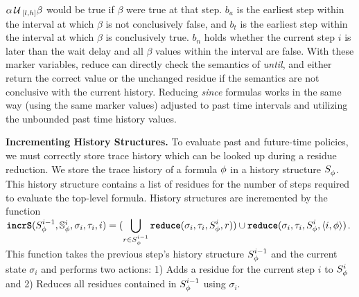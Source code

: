 $\alpha \until_{[l,h]} \beta$ would be true if $\beta$ were true at that step.
$b_a$ is the earliest step within the interval at which $\beta$ is not conclusively false,
and $b_t$ is the earliest step within the interval at which $\beta$ is conclusively true.
$b_n$ holds whether the current step $i$ is later than the wait delay and all $\beta$
values within the interval are false. With these marker variables, reduce can directly
check the semantics of \emph{until}, and either return the correct value or the unchanged
residue if the semantics are not conclusive with the current history. Reducing \emph{since}
formulas works in the same way (using the same marker values) adjusted to past time intervals
and utilizing the unbounded past time history values.


\textbf{Incrementing History Structures.}
To evaluate past and future-time policies, we must correctly store trace history which can be looked up during a residue reduction.
We store the trace history of a formula $\policyv$ in a history structure $\histst[\policyv]{}$.
This history structure contains a list of residues for the number of steps required to evaluate the top-level formula. History structures are incremented by the function
$\incrS(\histst[\policyv]{i-1}, \histSt[\policyv]{i}, \sigma_i, \tau_i, i) =
(\displaystyle\bigcup_{r \in \histst[\policyv]{i-1}} \reduce(\sigma_i, \tau_i, \histst[\policyv]{i}, r)) \cup
\reduce(\sigma_i, \tau_i, \histst[\policyv]{i}, \rp{i}{\policyv})$.
%
This function takes the previous step's history structure $\histst[\policyv]{i-1}$ and the current state $\sigma_i$
and performs two actions:
	1) Adds a residue for the current step $i$ to $\histst[\policyv]{i}$ and
	2) Reduces all residues contained in $\histst[\policyv]{i-1}$ using $\sigma_i$.


